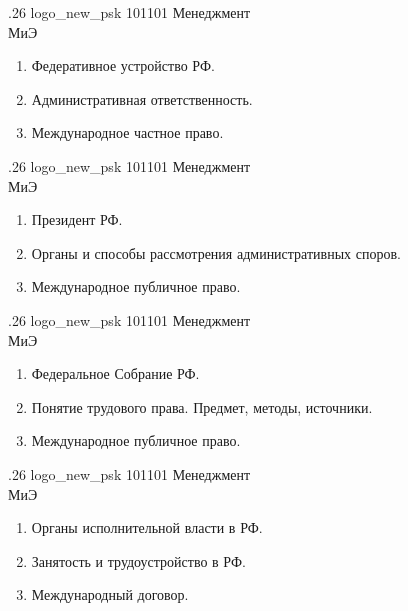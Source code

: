 \documentclass[
	12pt,
	a4paper,
	]
	{article}
\newcommand{\shapkFull}{
	\shapk
		{.26}
		{logo_new_psk}
		{101101}
		{Менеджмент\\}
		{МиЭ}
		{}
}
\begin{document}
\newpage


\shapkFull
\setcounter{zad}{0}

\begin{enumerate}
	\item Федеративное устройство РФ.

	\item Административная ответственность.

	\item Международное частное право.

\end{enumerate}

\newpage


\shapkFull
\setcounter{zad}{0}

\begin{enumerate}
	\item Президент РФ.

	\item Органы и способы рассмотрения административных споров.

	\item Международное публичное право.

\end{enumerate}

\newpage


\shapkFull
\setcounter{zad}{0}

\begin{enumerate}
	\item Федеральное Собрание РФ.

	\item Понятие трудового права. Предмет, методы, источники.

	\item Международное публичное право.

\end{enumerate}

\newpage


\shapkFull
\setcounter{zad}{0}

\begin{enumerate}
	\item Органы исполнительной власти в РФ.

	\item Занятость и трудоустройство в РФ.

	\item Международный договор.

\end{enumerate}
\end{document}
